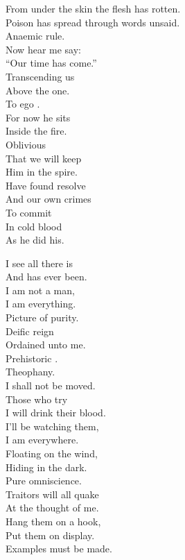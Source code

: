 From under the skin the flesh has rotten. \\
Poison has spread through words unsaid. \\
Anaemic rule. \\

Now hear me say: \\
``Our time has come.'' \\
Transcending us \\
Above the one. \\
To ego . \\

For now he sits \\
Inside the fire. \\
Oblivious \\
That we will keep \\
Him in the spire. \\

Have found resolve \\
And our own crimes \\
To commit \\
In cold blood \\
As he did his. \\





I see all there is \\
And has ever been. \\
I am not a man, \\
I am everything. \\
Picture of purity. \\

Deific reign \\
Ordained unto me. \\
Prehistoric . \\
Theophany. \\
I shall not be moved. \\
Those who try \\
I will drink their blood. \\

I'll be watching them, \\
I am everywhere. \\
Floating on the wind, \\
Hiding in the dark. \\
Pure omniscience. \\
Traitors will all quake \\
At the thought of me. \\
Hang them on a hook, \\
Put them on display. \\
Examples must be made. \\

